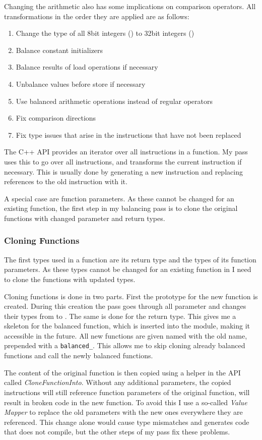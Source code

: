 Changing the arithmetic also has some implications on comparison operators.
All transformations in the order they are applied are as follows:
\begin{enumerate}
\item Change the type of all 8bit integers () to 32bit integers ()
\item Balance constant initializers
\item Balance results of load operations if necessary
\item Unbalance values before store if necessary
\item Use balanced arithmetic operations instead of regular operators
\item Fix comparison directions
\item Fix type issues that arise in the instructions that have not been replaced
\end{enumerate}

The \llvm{} C++ API provides an iterator over all instructions in a function.
My pass uses this to go over all instructions, and transforms the current instruction if necessary.
This is usually done by generating a new \ir{} instruction and replacing references to the old instruction with it.

A special case are function parameters.
As these cannot be changed for an existing function, the first step in my balancing pass is to clone the original functions with changed parameter and return types.

\subsubsection{Cloning Functions}
The first types used in a function are its return type and the types of its function parameters.
As these types cannot be changed for an existing function in \llvm{} I need to clone the functions with updated types.

Cloning functions is done in two parts.
First the prototype for the new function is created.
During this creation the pass goes through all parameter and changes their types from  to .
The same is done for the return type.
This gives me a skeleton for the balanced function, which is inserted into the module, making it accessible in the future.
All new functions are given named with the old name, prepended with a \texttt{balanced\_}.
This allows me to skip cloning already balanced functions and call the newly balanced functions.


The content of the original function is then copied using a helper in the \llvm{} API called \emph{CloneFunctionInto}.
Without any additional parameters, the copied instructions will still reference function parameters of the original function, will result in broken code in the new function.
To avoid this I use a so-called \emph{Value Mapper} to replace the old parameters with the new ones everywhere they are referenced.
This change alone would cause type mismatches and generates code that does not compile, but the other steps of my pass fix these problems.


